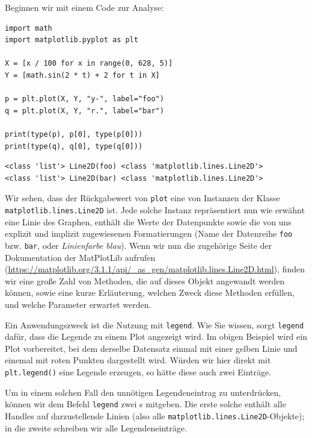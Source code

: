 Beginnen wir mit einem Code zur Analyse:
\begin{codebox}
\begin{verbatim}
import math
import matplotlib.pyplot as plt

X = [x / 100 for x in range(0, 628, 5)]
Y = [math.sin(2 * t) + 2 for t in X]

p = plt.plot(X, Y, "y-", label="foo")
q = plt.plot(X, Y, "r.", label="bar")

print(type(p), p[0], type(p[0]))
print(type(q), q[0], type(q[0]))
\end{verbatim}
\end{codebox}
%
\begin{cmdbox}
\begin{verbatim}
<class 'list'> Line2D(foo) <class 'matplotlib.lines.Line2D'>
<class 'list'> Line2D(bar) <class 'matplotlib.lines.Line2D'>
\end{verbatim}
\end{cmdbox}

Wir sehen, dass der Rückgabewert von \texttt{plot} eine  von Instanzen der Klasse \texttt{matplotlib.lines.Line2D} ist. Jede solche Instanz repräsentiert nun wie erwähnt eine Linie des Graphen, \ie enthält die Werte der Datenpunkte sowie die von uns explizit und implizit zugewiesenen Formatierungen (\eg Name der Datenreihe \texttt{foo} bzw. \texttt{bar}, oder \emph{Linienfarbe blau}). Wenn wir nun die zugehörige Seite der Dokumentation der MatPlotLib aufrufen (\url{https://matplotlib.org/3.1.1/api/_as_gen/matplotlib.lines.Line2D.html}), finden wir eine große Zahl von Methoden, die auf dieses Objekt angewandt werden können, sowie eine kurze Erläuterung, welchen Zweck diese Methoden erfüllen, und welche Parameter erwartet werden.

Ein Anwendungszweck ist die Nutzung mit \texttt{legend}. Wie Sie wissen, sorgt \texttt{legend} dafür, dass die Legende zu einem Plot angezeigt wird. Im obigen Beispiel wird ein Plot vorbereitet, bei dem derselbe Datensatz einmal mit einer gelben Linie und einemal mit roten Punkten dargestellt wird. Würden wir hier direkt mit \texttt{plt.legend()} eine Legende erzeugen, so hätte diese auch zwei Einträge.

Um in einem solchen Fall den unnötigen Legendeneintrag zu unterdrücken, können wir dem Befehl \texttt{legend} zwei s mitgeben. Die erste solche  enthält alle Handles auf darzustellende Linien (also alle \texttt{matplotlib.lines.Line2D}-Objekte); in die zweite  schreiben wir alle Legendeneinträge.

